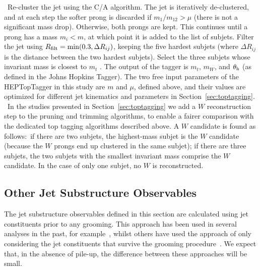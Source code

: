 ~Re-cluster the jet using the C/A algorithm. The jet is iteratively de-clustered, and at each step the softer prong is discarded if $m_1/m_{12}>\mu$ (there is not a significant mass drop). Otherwise, both prongs are kept. This continues until a prong has a mass $m_i < m$, at which point it is added to the list of subjets. Filter the jet using $R_{\rm filt}=\mathrm{min}(0.3,\Delta R_{ij})$, keeping the five hardest subjets (where $\Delta R_{ij}$ is the distance between the two hardest subjets). Select the three subjets whose invariant mass is closest to $m_t$ \cite{Plehn:2010st}. The output of the tagger is $m_t$, $m_W$, and $\theta_{\rm h}$ (as defined in the Johns Hopkins Tagger). The two free input parameters of the HEPTopTagger in this study are $m$ and $\mu$, defined above, and their values are optimized for different jet kinematics and parameters in Section~\ref{sec:toptagging}.\\

~In the studies presented in Section~\ref{sec:toptagging} we add a $W$ reconstruction step to the pruning and trimming algorithms, to enable a fairer comparison with the dedicated top tagging algorithms described above. A $W$ candidate is found as follows:~if there are two subjets, the highest-mass subjet is the $W$ candidate (because the $W$ prongs end up clustered in the same subjet); if there are three subjets, the two subjets with the smallest invariant mass comprise the $W$ candidate. In the case of only one subjet, no $W$ is reconstructed.\\


\subsection{Other Jet Substructure Observables} \label{sec:substructure}

The jet substructure observables defined in this section are calculated using jet constituents prior to any grooming. This approach has been used in several analyses in the past, for example~\cite{Khachatryan:2014hpa, Aad:2014haa}, whilst others have used the approach of only considering the jet constituents that survive the grooming procedure~\cite{ATL-PHYS-PUB-2014-004}. We expect that, in the absence of pile-up, the difference between these approaches will be small.\\


